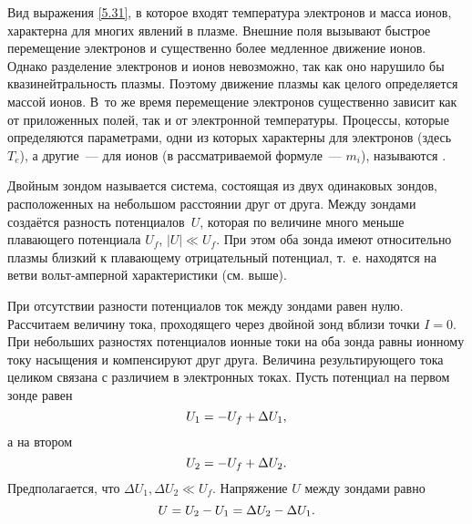 \begin{lab:note}
Вид выражения \eqref{5.31}, в которое входят температура электронов и масса
ионов, характерна для многих явлений в плазме.
Внешние поля вызывают быстрое перемещение электронов и существенно более
медленное движение ионов. Однако разделение электронов и ионов невозможно,
так как оно нарушило бы квазинейтральность плазмы.
Поэтому движение плазмы как целого определяется массой ионов. 
В~то же время перемещение электронов существенно зависит как от
приложенных полей, так и от электронной температуры. Процессы, которые
определяются параметрами, одни из которых
характерны для электронов (здесь~$T_e$), а другие~--- для ионов (в
рассматриваемой формуле~--- $m_i$), называются .
\end{lab:note}


\label{sec:double}

Двойным зондом называется система, состоящая из двух одинаковых зондов,
расположенных на небольшом расстоянии друг от
друга. Между зондами создаётся разность потенциалов~$U$, которая по величине много
меньше плавающего потенциала $U_f$, $|U|\ll U_f$. При
этом оба зонда имеют относительно плазмы близкий к плавающему отрицательный
потенциал, т.~е. находятся на  ветви
вольт-амперной характеристики (см. выше).

При отсутствии разности потенциалов ток между зондами равен нулю. Рассчитаем
величину тока, проходящего через двойной
зонд вблизи точки $I=0$. При небольших разностях потенциалов ионные токи на оба
зонда равны ионному току насыщения и
компенсируют друг друга. Величина результирующего тока целиком связана с
различием в электронных токах. Пусть потенциал
на первом зонде равен
\begin{equation*}
	\eqmark{5.32}
	U_1=-U_f+\Delta U_1,
\end{equation*}
а на втором
\begin{equation*}
	\eqmark{5.33}
	U_2=-U_f+\Delta U_2.
\end{equation*}
Предполагается, что $\Delta U_1, \Delta U_2 \ll U_f$.
Напряжение $U$ между зондами равно
\begin{equation*}
	\eqmark{5.34}
	U=U_2-U_1=\Delta U_2-\Delta U_1.
\end{equation*}

